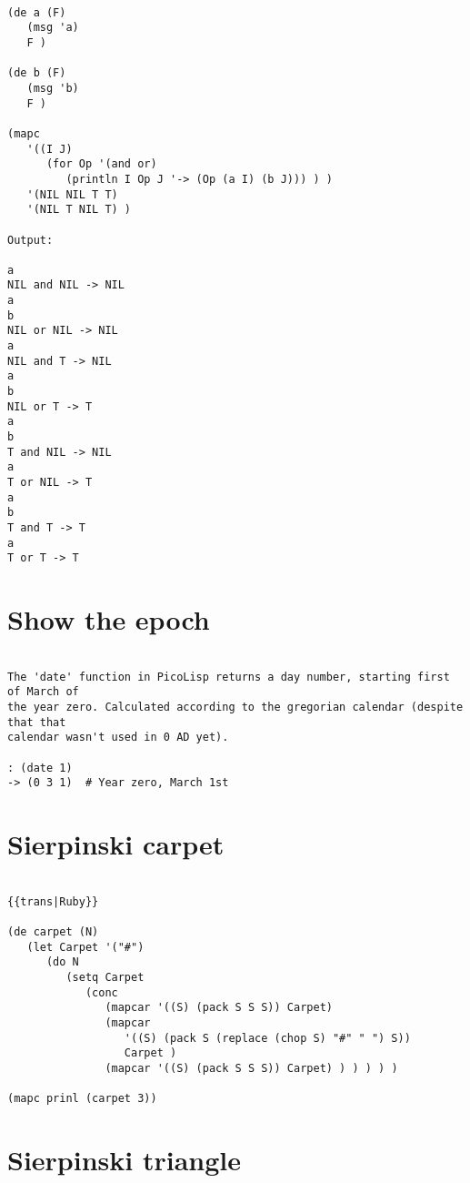 \begin{verbatim}

(de a (F)
   (msg 'a)
   F )

(de b (F)
   (msg 'b)
   F )

(mapc
   '((I J)
      (for Op '(and or)
         (println I Op J '-> (Op (a I) (b J))) ) )
   '(NIL NIL T T)
   '(NIL T NIL T) )

Output:

a
NIL and NIL -> NIL
a
b
NIL or NIL -> NIL
a
NIL and T -> NIL
a
b
NIL or T -> T
a
b
T and NIL -> NIL
a
T or NIL -> T
a
b
T and T -> T
a
T or T -> T

\end{verbatim}

\section*{Show the epoch}

\begin{verbatim}

The 'date' function in PicoLisp returns a day number, starting first of March of
the year zero. Calculated according to the gregorian calendar (despite that that
calendar wasn't used in 0 AD yet).

: (date 1)
-> (0 3 1)  # Year zero, March 1st

\end{verbatim}

\section*{Sierpinski carpet}

\begin{verbatim}

{{trans|Ruby}}

(de carpet (N)
   (let Carpet '("#")
      (do N
         (setq Carpet
            (conc
               (mapcar '((S) (pack S S S)) Carpet)
               (mapcar
                  '((S) (pack S (replace (chop S) "#" " ") S))
                  Carpet )
               (mapcar '((S) (pack S S S)) Carpet) ) ) ) ) )

(mapc prinl (carpet 3))

\end{verbatim}

\section*{Sierpinski triangle}

